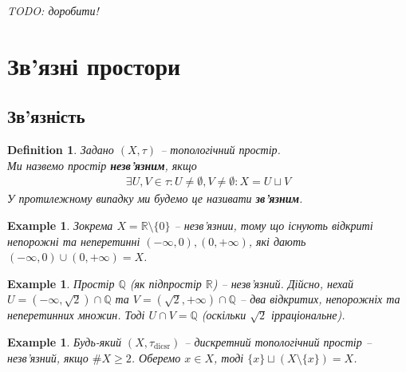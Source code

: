 \documentclass[a4paper, 10pt]{article}
\theoremstyle{theoremdd}
\newtheorem{definition}[theorem]{Definition}
\newtheorem{example}[theorem]{Example}
\begin{document}
\textit{TODO: доробити!}
\newpage

\section{Зв'язні простори}
\subsection{Зв'язність}
\iffalse
\begin{definition}
Задано $(X,\tau)$ -- топологічний простір.\\
Ми назвемо простір \textbf{зв'язним}, якщо $X \neq \emptyset$ та
\begin{align*}
\exists U,V \in \tau: X = U \sqcup V \implies U = \emptyset \text{ або } V = \emptyset
\end{align*}
У протилежному випадку ми будемо це називати \textbf{незв'язним}.
\end{definition}
\fi

\begin{definition}
Задано $(X,\tau)$ -- топологічний простір.\\
Ми назвемо простір \textbf{незв'язним}, якщо
\begin{align*}
\exists U,V \in \tau: U \neq \emptyset, V \neq \emptyset: X = U \sqcup V
\end{align*}
У протилежному випадку ми будемо це називати \textbf{зв'язним}.
\end{definition}

\begin{example}
Зокрема $X = \mathbb{R} \setminus \{0\}$ -- незв'язнии, тому що існують відкриті непорожні та неперетинні $(-\infty,0), (0,+\infty)$, які дають $(-\infty,0) \cup (0,+\infty) = X$.
\end{example}

\begin{example}
Простір $\mathbb{Q}$ (як підпростір $\mathbb{R}$) -- незв'язний. Дійсно, нехай $U = (-\infty,\sqrt{2}) \cap \mathbb{Q}$ та $V = (\sqrt{2},+\infty) \cap \mathbb{Q}$ -- два відкритих, непорожніх та неперетинних множин. Тоді $U \cap V = \mathbb{Q}$ (оскільки $\sqrt{2}$ ірраціональне).
\end{example}

\begin{example}
Будь-який $(X,\tau_{\text{dicsr}})$ -- дискретний топологічний простір -- незв'язний, якщо $\# X \geq 2$. Оберемо $x \in X$, тоді $\{x\} \sqcup (X \setminus \{x\}) = X$.
\end{example}
\end{document}
